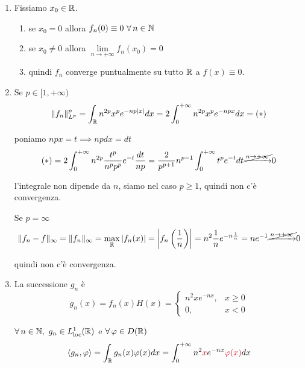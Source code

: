 \begin{enumerate}
\item Fissiamo $x_{0} \in \mathbb{R} $.
\begin{enumerate}
\item se $x_{0} = 0$ allora $f_{n}(0) \equiv 0\ \forall n\in \NN $
\item se $x_{0} \neq 0$ allora $\lim\limits _{n\rightarrow + \infty } f_{n}(x_{0}) = 0$
\item quindi $f_{n}$ converge puntualmente su tutto $\mathbb{R} $ a $f(x) \equiv 0$.
\end{enumerate}

\item Se $p\in [ 1, + \infty)$\begin{equation*}
\Vert f_{n}\Vert ^{p}_{L^{p}} = \int _{\mathbb{R} } n^{2p} x^{p} e^{ - np| x| } dx = 2\int ^{ + \infty }_{0} n^{2p} x^{p} e^{ - npx} dx = (*)
\end{equation*}

poniamo $npx = t\implies npdx = dt$\begin{equation*}
(*) = 2\int ^{ + \infty }_{0} n^{2p}\frac{t^{p}}{n^{p} p^{p}} e^{ - t}\frac{dt}{np} = \frac{2}{p^{p + 1}} n^{p - 1}\int ^{ + \infty }_{0} t^{p} e^{ - t} dt\cancel{\xrightarrow{n\rightarrow + \infty }} 0
\end{equation*}

l'integrale non dipende da $n$, siamo nel caso $p\geq 1$, quindi non c'è convergenza.

Se $p = \infty $\begin{equation*}
\Vert f_{n} - f\Vert _{\infty } = \Vert f_{n}\Vert _{\infty } = \max_{\mathbb{R} }| f_{n}(x)| = \left| f_{n}\left(\frac{1}{n}\right)\right| = n^{2}\frac{1}{n} e^{ - n\frac{1}{n}} = ne^{ - 1}\cancel{\xrightarrow{n\rightarrow + \infty }} 0
\end{equation*}

quindi non c'è convergenza.
\item La successione $g_{n}$ è\begin{equation*}
g_{n}(x) = f_{n}(x) H(x) = \begin{cases}
n^{2} xe^{ - nx} , & x\geq 0\\
0, & x < 0
\end{cases}
\end{equation*}

$\forall n\in \NN  ,\ g_{n} \in L^{1}_{\loc}(\RR)$ e $\forall \varphi \in D(\RR)$\begin{equation*}
\langle g_{n} ,\varphi \rangle = \int _{\RR } g_{n}(x) \varphi (x) dx = \int ^{ + \infty }_{0} n^{2}\textcolor[rgb]{0.82,0.01,0.11}{x} e^{ - nx}\textcolor[rgb]{0.82,0.01,0.11}{\varphi }\textcolor[rgb]{0.82,0.01,0.11}{(}\textcolor[rgb]{0.82,0.01,0.11}{x}\textcolor[rgb]{0.82,0.01,0.11}{)} dx
\end{equation*}


\end{enumerate}
